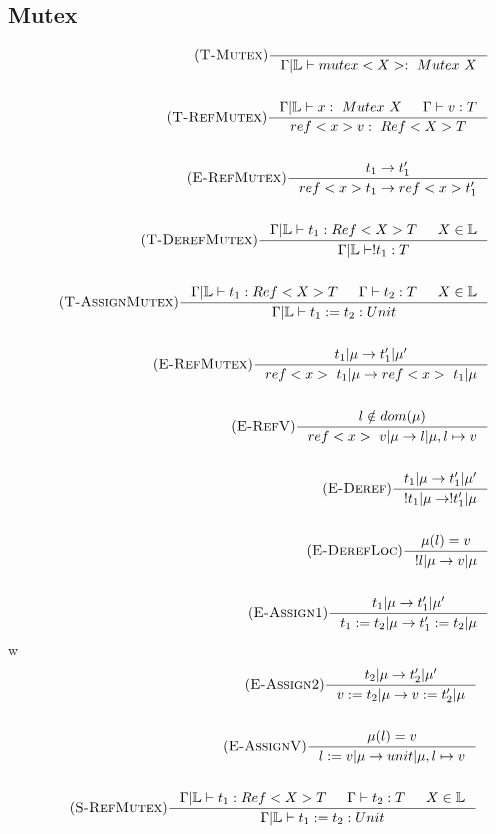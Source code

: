 \documentclass[12pt]{article}
\def\lock {\mathbb{L}}
\begin{document}
\subsection{Mutex}
\begin{align*}
    \tag {\textsc{T-Mutex}}
    \inference[]{
        }{\Gamma|\lock \vdash mutex<X> :~Mutex~X}
    \\
    \\
    \tag {\textsc{T-RefMutex}}
    \inference[]{\Gamma|\lock \vdash x :~Mutex~X & \Gamma \vdash v:T}{ref<x> v:~Ref<X>T}
    \\ 
    \\
    \tag {\textsc{E-RefMutex}}
    \inference[]{t_1->t_1'}{ref<x> t_1 -> ref<x> t_1'}
    \\
    \\
    \tag {\textsc{T-DerefMutex}}
    \inference[]{\Gamma|\lock \vdash t_1:Ref<X>T & X\in \lock}{\Gamma|\lock\vdash !t_1:T}
    \\
    \\
    \tag {\textsc{T-AssignMutex}}
    \inference[]{\Gamma|\lock \vdash t_1:Ref<X>T & \Gamma \vdash t_2:T & X\in \lock}{\Gamma|\lock\vdash t_1 := t_2:Unit}
    \\
    \\
    \tag {\textsc{E-RefMutex}}
    \inference[]{t_1|\mu->t_1'|\mu '}{ref<x>~t_1|\mu -> ref<x>~t_1|\mu}
    \\
    \\
    \tag {\textsc{E-RefV}}
    \inference[]{l\notin dom(\mu)}{ref<x>~v|\mu -> l|\mu,l\mapsto v}
    \\
    \\
    \tag {\textsc{E-Deref}}
    \inference[]{t_1|\mu->t_1'|\mu '}{!t_1|\mu -> !t_1'|\mu}
    \\
    \\
    \tag {\textsc{E-DerefLoc}}
    \inference[]{\mu(l)=v}{!l|\mu -> v|\mu}
    \\
    \\
    \tag {\textsc{E-Assign1}}
    \inference[]{t_1|\mu->t_1'|\mu '}{t_1:=t_2|\mu -> t_1':=t_2|\mu}
\end{align*}w
\begin{align*}
    \tag {\textsc{E-Assign2}}
    \inference[]{t_2|\mu->t_2'|\mu '}{v:=t_2|\mu -> v:=t_2'|\mu}
    \\
    \\
    \tag {\textsc{E-AssignV}}
    \inference[]{\mu(l)=v}{l:=v|\mu -> unit|\mu,l\mapsto v}
    \\
    \\
    \tag {\textsc{S-RefMutex}}
    \inference[]{\Gamma|\lock \vdash t_1:Ref<X>T & \Gamma \vdash t_2:T & X\in \lock}{\Gamma|\lock\vdash t_1 := t_2:Unit}
\end{align*}
\end{document}
